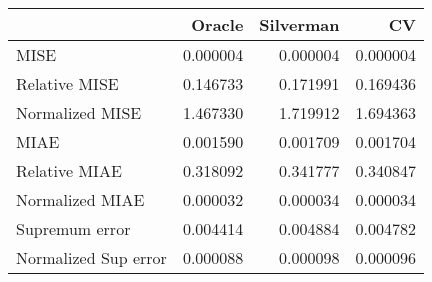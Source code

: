 \begin{tabular}{lrrr}
  \toprule
 & Oracle & Silverman & CV \\ 
  \midrule
MISE & 0.000004 & 0.000004 & 0.000004 \\ 
  Relative MISE & 0.146733 & 0.171991 & 0.169436 \\ 
  Normalized MISE & 1.467330 & 1.719912 & 1.694363 \\ 
  MIAE & 0.001590 & 0.001709 & 0.001704 \\ 
  Relative MIAE & 0.318092 & 0.341777 & 0.340847 \\ 
  Normalized MIAE & 0.000032 & 0.000034 & 0.000034 \\ 
  Supremum error & 0.004414 & 0.004884 & 0.004782 \\ 
  Normalized Sup error & 0.000088 & 0.000098 & 0.000096 \\ 
   \bottomrule
\end{tabular}
